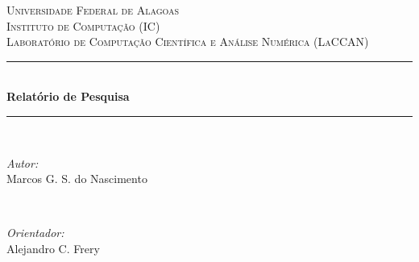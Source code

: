 \begin{titlepage}

\newcommand{\HRule}{\rule{\linewidth}{0.5mm}} %

\center %
 

\textsc{\LARGE Universidade Federal de Alagoas}\\[1.5cm] %
\textsc{\Large Instituto de Computação (IC)}\\[0.5cm] %
\textsc{\large Laboratório de Computação Científica e Análise Numérica (LaCCAN)}\\[0.5cm] %


\HRule \\[0.4cm]
{ \huge \bfseries Relatório de Pesquisa}\\[0.4cm] %
\HRule \\[1.5cm]
 

\begin{minipage}{0.4\textwidth}
\begin{flushleft} \large
\emph{Autor:}\\
Marcos G. S. do Nascimento %
\end{flushleft}
\end{minipage}
~
\begin{minipage}{0.4\textwidth}
\begin{flushright} \large
\emph{Orientador:} \\
Alejandro C. Frery  %
\end{flushright}
\end{minipage}\\[2cm]



\end{titlepage}

